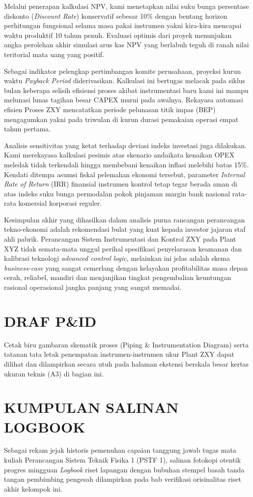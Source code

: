 \documentclass[12pt, a4paper]{report}
\begin{document}
Melalui penerapan kalkulasi NPV, kami menetapkan nilai suku bunga persentase diskonto (\textit{Discount Rate}) konservatif sebesar 10\% dengan bentang horizon perhitungan fungsional selama masa pakai instrumen yakni kira-kira mencapai waktu produktif 10 tahun penuh. Evaluasi optimis dari proyek menunjukan angka perolehan akhir simulasi arus kas NPV yang berlabuh teguh di ranah nilai teritorial mata uang yang positif. 

Sebagai indikator pelengkap pertimbangan komite perusahaan, proyeksi kurun waktu \textit{Payback Period} diderivasikan. Kalkulasi ini bertugas melacak pada siklus bulan keberapa selisih efisiensi proses akibat instrumentasi baru kami ini mampu melunasi lunas tagihan besar CAPEX murni pada awalnya. Rekayasa automasi efisien Proses ZXY mencatatkan periode pelunasan titik impas (BEP) mengagumkan yakni pada triwulan di kurun durasi pemakaian operasi empat tahun pertama.

Analisis sensitivitas yang ketat terhadap deviasi indeks investasi juga dilakukan. Kami merekayasa kalkulasi pesimis atas skenario andaikata kenaikan OPEX meledak tidak terkendali hingga membebani kenaikan inflasi melebihi batas 15\%. Kendati ditempa asumsi fiskal pelemahan ekonomi tersebut, parameter \textit{Internal Rate of Return} (IRR) finansial instrumen kontrol tetap tegar berada aman di atas indeks suku bunga permodalan pokok pinjaman margin bank nasional rata-rata komersial korporasi reguler.

Kesimpulan akhir yang dihasilkan dalam analisis purna rancangan perancangan tekno-ekonomi adalah rekomendasi bulat yang kuat kepada investor jajaran staf ahli pabrik. Perancangan Sistem Instrumentasi dan Kontrol ZXY pada Plant XYZ tidak semata-mata unggul perihal spesifikasi penyelarasan keamanan dan kalibrasi teknologi \textit{advanced control logic}, melainkan ini jelas adalah skema \textit{business-case} yang sangat cemerlang dengan kelayakan profitabilitas masa depan cerah, reliabel, mandiri dan menjanjikan tingkat pengembalian keuntungan rasional operasional jangka panjang yang sangat memadai.

\appendix
\chapter{DRAF P\&ID}
Cetak biru gambaran skematik proses (Piping \& Instrumentation Diagram) serta tatanan tata letak penempatan instrumen-instrumen ukur Plant ZXY dapat dilihat dan dilampirkan secara utuh pada halaman ekstensi berskala besar kertas ukuran teknis (A3) di bagian ini.

\chapter{KUMPULAN SALINAN LOGBOOK}
Sebagai rekam jejak historis pemenuhan capaian tanggung jawab tugas mata kuliah Perancangan Sistem Teknik Fisika 1 (PSTF 1), salinan fotokopi otentik progres mingguan \textit{Logbook} riset lapangan dengan bubuhan stempel basah tanda tangan pembimbing pengesah dilampirkan pada bab verifikasi orisinalitas riset akhir kelompok ini.
\end{document}
